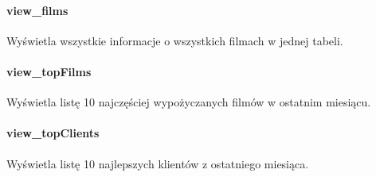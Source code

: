 \documentclass[12pt,a4paper,titlepage]{article}
\begin{document}
\paragraph{view\_films}
Wyświetla wszystkie informacje o wszystkich filmach w jednej tabeli.

\paragraph{view\_topFilms}
Wyświetla listę 10 najczęściej wypożyczanych filmów w ostatnim miesiącu.

\paragraph{view\_topClients}
Wyświetla listę 10 najlepszych klientów z ostatniego miesiąca.
\end{document}
